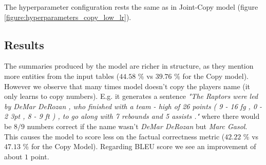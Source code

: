 The hyperparameter configuration rests the same as in Joint-Copy model (figure \ref{figure:hyperparameters_copy_low_lr}).

\subsection{Results}

The summaries produced by the model are richer in structure, as they mention more entities from the input tables ($44.58$ \% vs $39.76$ \% for the Copy model). However we observe that many times model doesn't copy the players name (it only learns to copy numbers). E.g. it generates a sentence \emph{"The Raptors were led by DeMar DeRozan , who finished with a team - high of 26 points ( 9 - 16 fg , 0 - 2 3pt , 8 - 9 ft ) , to go along with 7 rebounds and 5 assists ."} where there would be $8 / 9$ numbers correct if the name wasn't \emph{DeMar DeRozan} but \emph{Marc Gasol}. This causes the model to score less on the factual correctness metric ($42.22$ \% vs $47.13$ \% for the Copy Model). Regarding BLEU score we see an improvement of about $1$ point.

\begin{table}[h]
    \centering
    \caption{Performance metrics on the joint-copy model with content selection encoder.} \label{table:metrics_copy_content_selection}
\end{table}

